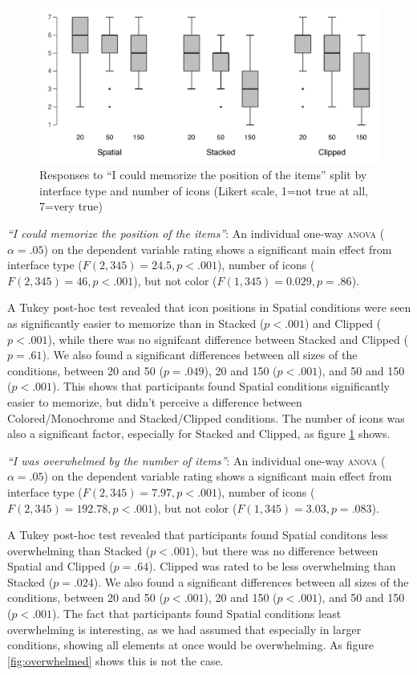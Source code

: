 \documentclass[nobib]{tufte-book} %
\begin{document}
\begin{figure}
  \includegraphics{postcon-memorize.pdf}
  \caption{Responses to ``I could memorize the position of the items'' split by interface type and number of icons (Likert scale, 1=not true at all, 7=very true)}
  \label{fig:memorize}
\end{figure}

\emph{``I could memorize the position of the items''}:
An individual one-way \textsc{anova} ($\alpha = .05$) on the dependent variable rating shows a significant main effect from interface type ($F(2,345) = 24.5, p < .001$), number of icons ($F(2,345) = 46, p < .001$), but not color ($F(1,345) = 0.029, p = .86$).

A Tukey post-hoc test revealed that icon positions in Spatial conditions were seen as significantly easier to memorize than in Stacked ($p < .001$) and Clipped ($p < .001$), while there was no signifcant difference between Stacked and Clipped ($p = .61$). We also found a significant differences between all sizes of the conditions, between 20 and 50 ($p = .049$), 20 and 150 ($p < .001$), and 50 and 150 ($p < .001$). This shows that participants found Spatial conditions significantly easier to memorize, but didn't perceive a difference between Colored/Monochrome and Stacked/Clipped conditions. The number of icons was also a significant factor, especially for Stacked and Clipped, as figure \ref{fig:memorize} shows.

\emph{``I was overwhelmed by the number of items''}:
An individual one-way \textsc{anova} ($\alpha = .05$) on the dependent variable rating shows a significant main effect from interface type ($F(2,345) = 7.97, p < .001$), number of icons ($F(2,345) = 192.78, p < .001$), but not color ($F(1,345) = 3.03, p = .083$).

A Tukey post-hoc test revealed that participants found Spatial conditons less overwhelming than Stacked ($p < .001$), but there was no difference between Spatial and Clipped ($p = .64$). Clipped was rated to be less overwhelming than Stacked ($p = .024$). We also found a significant differences between all sizes of the conditions, between 20 and 50 ($p < .001$), 20 and 150 ($p < .001$), and 50 and 150 ($p < .001$). The fact that participants found Spatial conditions least overwhelming is interesting, as we had assumed that especially in larger conditions, showing all elements at once would be overwhelming. As figure \ref{fig:overwhelmed} shows this is not the case.
\end{document}
